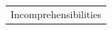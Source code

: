 \documentclass{article}
\begin{document}
\begin{tabular}{p{1cm}}
Incomprehensibilities \\
\end{tabular}
\end{document}
